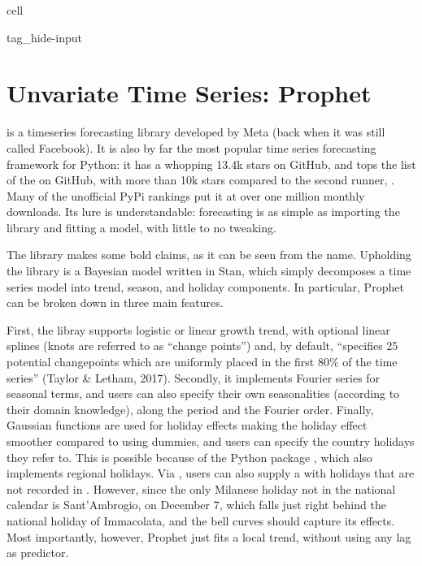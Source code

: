 \documentclass[letterpaper,10pt,english]{jupyterBook}
\begin{document}
\begin{sphinxuseclass}{cell}
\begin{sphinxuseclass}{tag_hide-input}
\end{sphinxuseclass}
\end{sphinxuseclass}

\section{Unvariate Time Series: Prophet}
\label{\detokenize{06-forecasting:unvariate-time-series-prophet}}
\sphinxAtStartPar
{} is a time\sphinxhyphen{}series forecasting library developed by Meta (back when it was still called Facebook). It is also by far the most popular time series forecasting framework for Python: it has a whopping 13.4k stars on GitHub, and tops the list of the   on GitHub, with more than 10k stars compared to the second runner, . Many of the \sphinxhyphen{} unofficial \sphinxhyphen{} PyPi rankings  put it at over one million monthly downloads. Its lure is understandable: forecasting is as simple as importing the library and fitting a model, with little to no tweaking.

\sphinxAtStartPar
The library makes some bold claims, as it can be seen from the name. Upholding the library is a Bayesian model written in Stan, which simply decomposes a time series model into trend, season, and holiday components. In particular, Prophet can be broken down in three main features.

\sphinxAtStartPar
First, the libray supports logistic or linear growth trend, with optional linear splines (knots are referred to as “change points”) and, by default, “specifies 25 potential changepoints which are uniformly placed in the first 80\% of the time series” (Taylor \& Letham, 2017). Secondly, it implements Fourier series for seasonal terms, and users can also specify their own seasonalities (according to their domain knowledge), along the period and the Fourier order. Finally, Gaussian functions are used for holiday effects \sphinxhyphen{} making the holiday effect smoother compared to using dummies, and users can specify the country holidays they refer to. This is possible because of the Python package , which also implements regional holidays. Via , users can also supply a  with holidays that are not recorded in . However, since the only Milanese holiday not in the national calendar is Sant’Ambrogio, on December 7, which falls just right behind the national holiday of Immacolata, and the bell curves should capture its effects. Most importantly, however, Prophet just fits a local trend, without using any lag as predictor.
\end{document}
